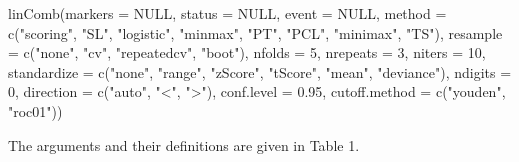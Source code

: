 \documentclass[]{article}
\newcommand{\hlnum}[1]{\textcolor[rgb]{0.816,0.125,0.439}{#1}}%
\newcommand{\hlstr}[1]{\textcolor[rgb]{0.251,0.627,0.251}{#1}}%
\newcommand{\hlstd}[1]{\textcolor[rgb]{0.251,0.251,0.251}{#1}}%
\newenvironment{Shaded}{\begin{myshaded}}{\end{myshaded}}
\newcommand{\DecValTok}[1]{\hlnum{#1}}
\newcommand{\FloatTok}[1]{\hlnum{#1}}
\newcommand{\ConstantTok}[1]{\hlnum{#1}}
\newcommand{\StringTok}[1]{\hlstr{#1}}
\newcommand{\FunctionTok}[1]{\hlstd{#1}}
\newcommand{\AttributeTok}[1]{{#1}}
\newcommand{\NormalTok}[1]{\hlstd{#1}}
\begin{document}
\begin{Shaded}
\begin{Highlighting}[]
\FunctionTok{linComb}\NormalTok{(}\AttributeTok{markers =} \ConstantTok{NULL}\NormalTok{,}
        \AttributeTok{status =} \ConstantTok{NULL}\NormalTok{,}
        \AttributeTok{event =} \ConstantTok{NULL}\NormalTok{,}
        \AttributeTok{method =} \FunctionTok{c}\NormalTok{(}\StringTok{"scoring"}\NormalTok{,}
                   \StringTok{"SL"}\NormalTok{,}
                   \StringTok{"logistic"}\NormalTok{,}
                   \StringTok{"minmax"}\NormalTok{,}
                   \StringTok{"PT"}\NormalTok{,}
                   \StringTok{"PCL"}\NormalTok{,}
                   \StringTok{"minimax"}\NormalTok{,}
                   \StringTok{"TS"}\NormalTok{),}
        \AttributeTok{resample =} \FunctionTok{c}\NormalTok{(}\StringTok{"none"}\NormalTok{, }\StringTok{"cv"}\NormalTok{, }\StringTok{"repeatedcv"}\NormalTok{, }\StringTok{"boot"}\NormalTok{),}
        \AttributeTok{nfolds =} \DecValTok{5}\NormalTok{,}
        \AttributeTok{nrepeats =} \DecValTok{3}\NormalTok{,}
        \AttributeTok{niters =} \DecValTok{10}\NormalTok{,}
        \AttributeTok{standardize =} \FunctionTok{c}\NormalTok{(}\StringTok{"none"}\NormalTok{, }\StringTok{"range"}\NormalTok{,}
                        \StringTok{"zScore"}\NormalTok{, }\StringTok{"tScore"}\NormalTok{, }\StringTok{"mean"}\NormalTok{, }\StringTok{"deviance"}\NormalTok{),}
        \AttributeTok{ndigits =} \DecValTok{0}\NormalTok{,}
        \AttributeTok{direction =} \FunctionTok{c}\NormalTok{(}\StringTok{"auto"}\NormalTok{, }\StringTok{"\textless{}"}\NormalTok{, }\StringTok{"\textgreater{}"}\NormalTok{),}
        \AttributeTok{conf.level =} \FloatTok{0.95}\NormalTok{,}
        \AttributeTok{cutoff.method =} \FunctionTok{c}\NormalTok{(}\StringTok{"youden"}\NormalTok{, }\StringTok{"roc01"}\NormalTok{))}
\end{Highlighting}
\end{Shaded}

The arguments and their definitions are given in Table 1.
\end{document}
